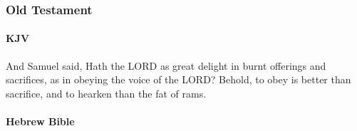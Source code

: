 	\subsubsection{Old Testament} %
		\label{OBEDIENCE-OT}
	
		\paragraph{KJV}
			\label{OBEDIENCE-OT-KJV}
	
			
			\begin{compactdesc}
				\item[{\hyperref[1SAMUEL-15-22]{1 Samuel 15:22}}] And Samuel said, Hath the LORD as great delight in burnt offerings and sacrifices, as in obeying the voice of the LORD?  Behold, to obey is better than sacrifice, and to hearken than the fat of rams.
			\end{compactdesc}
			
		\paragraph{Hebrew Bible}
			\label{OBEDIENCE-HEBREW}
		
			\subparagraph{\texorpdfstring{}{}} %
				\label{SHAMA} %
			
